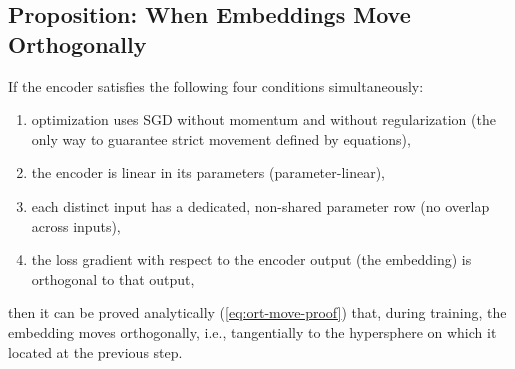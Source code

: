 \subsection{Proposition: When Embeddings Move Orthogonally}

If the encoder satisfies the following four conditions simultaneously:
\begin{enumerate}
  \item optimization uses SGD without momentum and without regularization (the only way to guarantee strict movement defined by equations), 
  \item the encoder is linear in its parameters (parameter-linear),
  \item each distinct input has a dedicated, non-shared parameter row (no overlap across inputs),
  \item the loss gradient with respect to the encoder output (the embedding) is orthogonal to that output,
\end{enumerate}

then it can be proved analytically (\ref{eq:ort-move-proof}) that, during training, the embedding moves orthogonally, i.e., tangentially to the hypersphere on which it located at the previous step.
